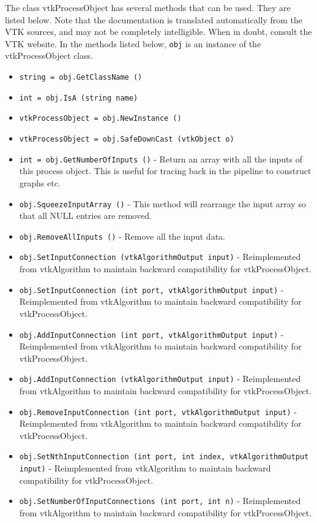 The class vtkProcessObject has several methods that can be used.
  They are listed below.
Note that the documentation is translated automatically from the VTK sources,
and may not be completely intelligible.  When in doubt, consult the VTK website.
In the methods listed below, \verb|obj| is an instance of the vtkProcessObject class.
\begin{itemize}
\item  \verb|string = obj.GetClassName ()|

\item  \verb|int = obj.IsA (string name)|

\item  \verb|vtkProcessObject = obj.NewInstance ()|

\item  \verb|vtkProcessObject = obj.SafeDownCast (vtkObject o)|

\item  \verb|int = obj.GetNumberOfInputs ()| -  Return an array with all the inputs of this process object.
 This is useful for tracing back in the pipeline to construct
 graphs etc.

\item  \verb|obj.SqueezeInputArray ()| -  This method will rearrange the input array so that all NULL entries 
 are removed.

\item  \verb|obj.RemoveAllInputs ()| -  Remove all the input data.

\item  \verb|obj.SetInputConnection (vtkAlgorithmOutput input)| -  Reimplemented from vtkAlgorithm to maintain backward
 compatibility for vtkProcessObject.

\item  \verb|obj.SetInputConnection (int port, vtkAlgorithmOutput input)| -  Reimplemented from vtkAlgorithm to maintain backward
 compatibility for vtkProcessObject.

\item  \verb|obj.AddInputConnection (int port, vtkAlgorithmOutput input)| -  Reimplemented from vtkAlgorithm to maintain backward
 compatibility for vtkProcessObject.

\item  \verb|obj.AddInputConnection (vtkAlgorithmOutput input)| -  Reimplemented from vtkAlgorithm to maintain backward
 compatibility for vtkProcessObject.

\item  \verb|obj.RemoveInputConnection (int port, vtkAlgorithmOutput input)| -  Reimplemented from vtkAlgorithm to maintain backward
 compatibility for vtkProcessObject.

\item  \verb|obj.SetNthInputConnection (int port, int index, vtkAlgorithmOutput input)| -  Reimplemented from vtkAlgorithm to maintain backward
 compatibility for vtkProcessObject.

\item  \verb|obj.SetNumberOfInputConnections (int port, int n)| -  Reimplemented from vtkAlgorithm to maintain backward
 compatibility for vtkProcessObject.

\end{itemize}
